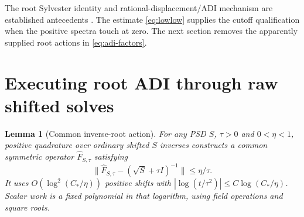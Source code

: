 \documentclass[11pt]{article}
\newtheorem{lemma}[theorem]{Lemma}
\numberwithin{equation}{section}
\begin{document}
The root Sylvester identity and rational-displacement/ADI mechanism
are established antecedents \cite{SDA,BT}. The estimate
\eqref{eq:lowlow} supplies the cutoff qualification when the positive
spectra touch at zero. The next section removes the apparently supplied
root actions in \eqref{eq:adi-factors}.

\section{Executing root ADI through raw shifted solves}

\begin{lemma}[Common inverse-root action]\label{lem:root-action}
For any PSD $S$, $\tau>0$ and $0<\eta<1$, positive quadrature over
ordinary shifted $S$ inverses constructs a common symmetric operator
$\widehat F_{S,\tau}$ satisfying
\begin{equation}\label{eq:root-action-error}
 \|\widehat F_{S,\tau}-(\sqrt S+\tau I)^{-1}\|\le\eta/\tau.
\end{equation}
It uses $O(\log^2(C_*/\eta))$ positive shifts with
$|\log(t/\tau^2)|\le C\log(C_*/\eta)$. Scalar work is a fixed
polynomial in that logarithm, using field operations and square roots.
\end{lemma}
\end{document}
